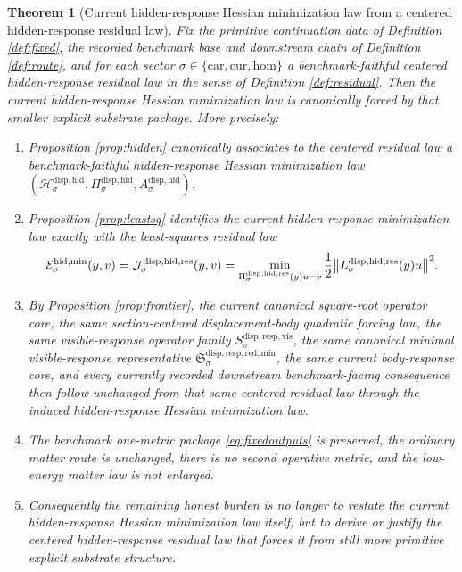 \documentclass[11pt]{article}
\newcommand{\Car}{\mathrm{car}}
\newcommand{\Cur}{\mathrm{cur}}
\newcommand{\Hom}{\mathrm{hom}}
\newcommand{\VisibleResponseOperator}[1]{S_{#1}^{\mathrm{disp,resp,vis}}}
\newcommand{\MinimalReducedStructure}{\mathfrak S^{\mathrm{disp,resp,red,min}}}
\newcommand{\HiddenCarrier}[1]{\mathcal H_{#1}^{\mathrm{disp,hid}}}
\newcommand{\HiddenReadout}[1]{\Pi_{#1}^{\mathrm{disp,hid}}}
\newcommand{\HiddenHessian}[1]{A_{#1}^{\mathrm{disp,hid}}}
\newcommand{\HiddenMinEnergy}[1]{\mathcal E_{#1}^{\mathrm{hid,min}}}
\newcommand{\ResidualReadout}[1]{\Pi_{#1}^{\mathrm{disp,hid,res}}}
\newcommand{\ResidualOperator}[1]{L_{#1}^{\mathrm{disp,hid,res}}}
\newcommand{\ResidualLeastSquares}[1]{\mathcal J_{#1}^{\mathrm{disp,hid,res}}}
\newtheorem{theorem}{Theorem}
\begin{document}
\begin{theorem}[Current hidden-response Hessian minimization law from a centered hidden-response residual law]
\label{thm:main}
Fix the primitive continuation data of Definition \ref{def:fixed}, the recorded benchmark base and downstream chain of Definition \ref{def:route}, and for each sector \(\sigma\in\{\Car,\Cur,\Hom\}\) a benchmark-faithful centered hidden-response residual law in the sense of Definition \ref{def:residual}. Then the current hidden-response Hessian minimization law is canonically forced by that smaller explicit substrate package. More precisely:
\begin{enumerate}
    \item Proposition \ref{prop:hidden} canonically associates to the centered residual law a benchmark-faithful hidden-response Hessian minimization law \((\HiddenCarrier{\sigma},\HiddenReadout{\sigma},\HiddenHessian{\sigma})\).
    \item Proposition \ref{prop:leastsq} identifies the current hidden-response minimization law exactly with the least-squares residual law
    \[
    \HiddenMinEnergy{\sigma}(y,v)
    =
    \ResidualLeastSquares{\sigma}(y,v)
    =
    \min_{\ResidualReadout{\sigma}(y)u=v}
    \frac{1}{2}\norm{\ResidualOperator{\sigma}(y)u}^{2}.
    \]
    \item By Proposition \ref{prop:frontier}, the current canonical square-root operator core, the same section-centered displacement-body quadratic forcing law, the same visible-response operator family \(\VisibleResponseOperator{\sigma}\), the same canonical minimal visible-response representative \(\MinimalReducedStructure_{\sigma}\), the same current body-response core, and every currently recorded downstream benchmark-facing consequence then follow unchanged from that same centered residual law through the induced hidden-response Hessian minimization law.
    \item The benchmark one-metric package \eqref{eq:fixedoutputs} is preserved, the ordinary matter route is unchanged, there is no second operative metric, and the low-energy matter law is not enlarged.
    \item Consequently the remaining honest burden is no longer to restate the current hidden-response Hessian minimization law itself, but to derive or justify the centered hidden-response residual law that forces it from still more primitive explicit substrate structure.
\end{enumerate}
\end{theorem}
\end{document}
